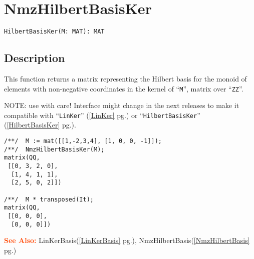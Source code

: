\documentclass[a4paper]{mybook}
\newenvironment{command}{}{} %
\newcommand\SeeAlso{\par\textcolor{OrangeRed}{\textbf{\large See Also: }}}
\begin{document}
\section{NmzHilbertBasisKer}
\label{NmzHilbertBasisKer}
\begin{command} %


\begin{Verbatim}[label=syntax, rulecolor=\color{MidnightBlue},
frame=single]
HilbertBasisKer(M: MAT): MAT
\end{Verbatim}


\subsection*{Description}

This function returns a matrix representing the Hilbert basis for the monoid
of elements with non-negative coordinates in the kernel of ``\verb&M&'',
matrix over ``\verb&ZZ&''.
\par 
NOTE: use with care!  Interface might change in the next releases to
make it compatible with ``\verb&LinKer&'' (\ref{LinKer} pg.\pageref{LinKer}) or ``\verb&HilbertBasisKer&'' (\ref{HilbertBasisKer} pg.\pageref{HilbertBasisKer}).
\begin{Verbatim}[label=example, rulecolor=\color{PineGreen}, frame=single]
/**/  M := mat([[1,-2,3,4], [1, 0, 0, -1]]);
/**/  NmzHilbertBasisKer(M);
matrix(QQ,
 [[0, 3, 2, 0],
  [1, 4, 1, 1],
  [2, 5, 0, 2]])

/**/  M * transposed(It);
matrix(QQ,
 [[0, 0, 0],
  [0, 0, 0]])
\end{Verbatim}


\SeeAlso %
  LinKerBasis(\ref{LinKerBasis} pg.\pageref{LinKerBasis}), 
    NmzHilbertBasis(\ref{NmzHilbertBasis} pg.\pageref{NmzHilbertBasis})
\end{command} %
\end{document}
